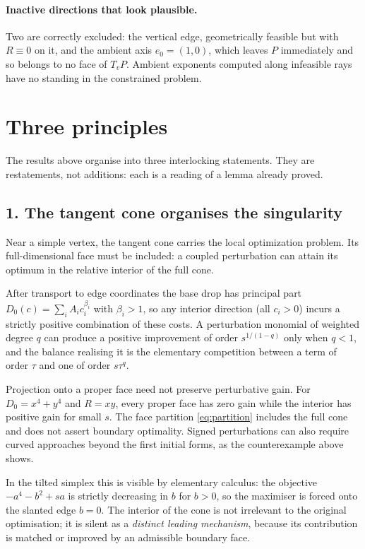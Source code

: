 \documentclass[11pt]{article}
\theoremstyle{definition}
\theoremstyle{remark}
\begin{document}
\paragraph{Inactive directions that look plausible.}
Two are correctly excluded: the vertical edge, geometrically feasible but with
$R\equiv0$ on it, and the ambient axis $e_0=(1,0)$, which leaves $P$
immediately and so belongs to no face of $T_vP$. Ambient exponents computed
along infeasible rays have no standing in the constrained problem.

\section{Three principles}

The results above organise into three interlocking statements. They are
restatements, not additions: each is a reading of a lemma already proved.

\subsection*{1. The tangent cone organises the singularity}

Near a simple vertex, the tangent cone carries the local optimization
problem. Its full-dimensional face must be included: a coupled perturbation
can attain its optimum in the relative interior of the full cone.

After transport to edge coordinates the base drop has principal part
$D_0(c)=\sum_iA_ic_i^{\beta_i}$ with $\beta_i>1$, so any interior direction
(all $c_i>0$) incurs a strictly positive combination of these costs. A
perturbation monomial of weighted degree $q$ can produce a positive
improvement of order $s^{1/(1-q)}$ only when $q<1$, and the balance realising
it is the elementary competition between a term of order $\tau$ and one of
order $s\tau^{q}$.

Projection onto a proper face need not preserve perturbative gain. For
$D_0=x^4+y^4$ and $R=xy$, every proper face has zero gain while the
interior has positive gain for small $s$. The face partition
\eqref{eq:partition} includes the full cone and does not assert boundary
optimality. Signed perturbations can also require curved approaches beyond
the first initial forms, as the counterexample above shows.

In the tilted simplex this is visible by elementary calculus: the objective
$-a^4-b^2+sa$ is strictly decreasing in $b$ for $b>0$, so the maximiser is
forced onto the slanted edge $b=0$. The interior of the cone is not irrelevant
to the original optimisation; it is silent as a \emph{distinct leading
mechanism}, because its contribution is matched or improved by an admissible
boundary face.
\end{document}
